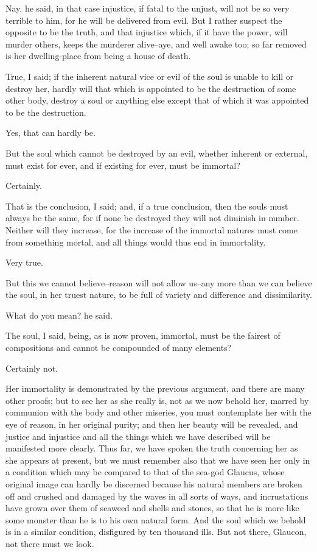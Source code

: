 Nay, he said, in that case injustice, if fatal to the unjust, will not
be so very terrible to him, for he will be delivered from evil. But I
rather suspect the opposite to be the truth, and that injustice which,
if it have the power, will murder others, keeps the murderer alive--aye,
and well awake too; so far removed is her dwelling-place from being a
house of death.

True, I said; if the inherent natural vice or evil of the soul is unable
to kill or destroy her, hardly will that which is appointed to be the
destruction of some other body, destroy a soul or anything else except
that of which it was appointed to be the destruction.

Yes, that can hardly be.

But the soul which cannot be destroyed by an evil, whether inherent
or external, must exist for ever, and if existing for ever, must be
immortal?

Certainly.

That is the conclusion, I said; and, if a true conclusion, then the
souls must always be the same, for if none be destroyed they will not
diminish in number. Neither will they increase, for the increase of the
immortal natures must come from something mortal, and all things would
thus end in immortality.

Very true.

But this we cannot believe--reason will not allow us--any more than we
can believe the soul, in her truest nature, to be full of variety and
difference and dissimilarity.

What do you mean? he said.

The soul, I said, being, as is now proven, immortal, must be the fairest
of compositions and cannot be compounded of many elements?

Certainly not.

Her immortality is demonstrated by the previous argument, and there are
many other proofs; but to see her as she really is, not as we now behold
her, marred by communion with the body and other miseries, you must
contemplate her with the eye of reason, in her original purity; and
then her beauty will be revealed, and justice and injustice and all the
things which we have described will be manifested more clearly. Thus
far, we have spoken the truth concerning her as she appears at present,
but we must remember also that we have seen her only in a condition
which may be compared to that of the sea-god Glaucus, whose original
image can hardly be discerned because his natural members are broken
off and crushed and damaged by the waves in all sorts of ways, and
incrustations have grown over them of seaweed and shells and stones, so
that he is more like some monster than he is to his own natural form.
And the soul which we behold is in a similar condition, disfigured by
ten thousand ills. But not there, Glaucon, not there must we look.

